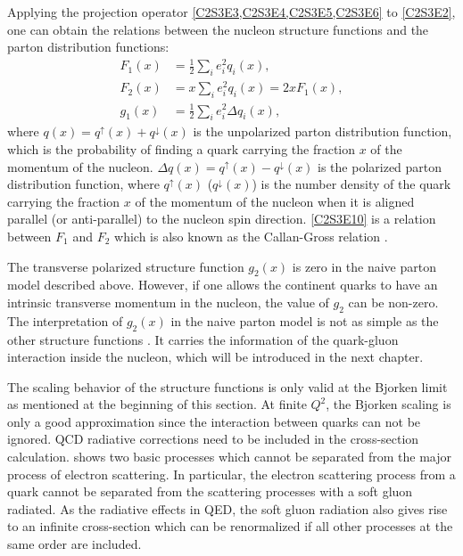 Applying the projection operator \cref{C2S3E3,C2S3E4,C2S3E5,C2S3E6} to \cref{C2S3E2}, one can obtain the relations between the nucleon structure functions and the parton distribution functions:
\begin{align} \label{C2S3E9}
F_1(x) & = \frac{1}{2}\sum_ie_i^2q_i(x), \\ \label{C2S3E10}
F_2(x) & = x\sum_ie_i^2q_i(x) = 2xF_1(x), \\ \label{C2S3E11}
g_1(x) & = \frac{1}{2}\sum_ie_i^2\Delta q_i(x),
\end{align}
where $q(x)=q^\uparrow(x)+q^\downarrow(x)$ is the unpolarized parton distribution function, which is the probability of finding a quark carrying the fraction $x$ of the momentum of the nucleon. $\Delta q(x)=q^\uparrow(x)-q^\downarrow(x)$ is the polarized parton distribution function, where $q^\uparrow(x)$ ($q^\downarrow(x)$) is the number density of the quark carrying the fraction $x$ of the momentum of the nucleon when it is aligned parallel (or anti-parallel) to the nucleon spin direction. \cref{C2S3E10} is a relation between $F_1$ and $F_2$ which is also known as the Callan-Gross relation \cite{Callan1969}.

The transverse polarized structure function $g_2(x)$ is zero in the naive parton model described above. However, if one allows the continent quarks to have an intrinsic transverse momentum in the nucleon, the value of $g_2$ can be non-zero.
The interpretation of $g_2(x)$ in the naive parton model is not as simple as the other structure functions \cite{Thomas2001}. It carries the information of the quark-gluon interaction inside the nucleon, which will be introduced in the next chapter.

The scaling behavior of the structure functions is only valid at the Bjorken limit as mentioned at the beginning of this section. At finite $Q^2$, the Bjorken scaling is only a good approximation since the interaction between quarks can not be ignored. QCD radiative corrections need to be included in the cross-section calculation.  shows two basic processes which cannot be separated from the major process of electron scattering. In particular, the electron scattering process from a quark cannot be separated from the scattering processes with a soft gluon radiated. As the radiative effects in QED, the soft gluon radiation also gives rise to an infinite cross-section which can be renormalized if all other processes at the same order are included.

